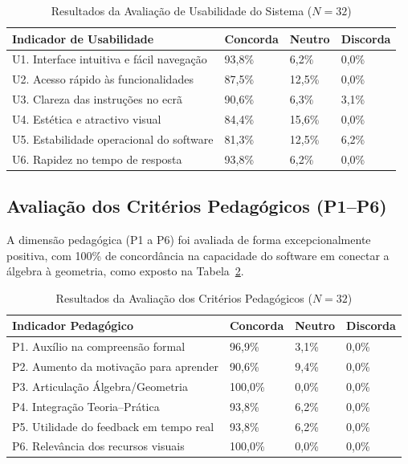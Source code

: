 \documentclass[conference]{IEEEtran}
\begin{document}
\begin{table}[htbp]
\caption{Resultados da Avaliação de Usabilidade do Sistema ($N=32$)}
\label{tab:usabilidade}
\centering
\footnotesize
\begin{tabular}{|p{3.6cm}|p{0.85cm}|p{0.75cm}|p{0.85cm}|}
\hline
\textbf{Indicador de Usabilidade} & \textbf{Concorda} & \textbf{Neutro} & \textbf{Discorda} \\
\hline
U1. Interface intuitiva e fácil navegação & 93,8\% & 6,2\% & 0,0\% \\
\hline
U2. Acesso rápido às funcionalidades & 87,5\% & 12,5\% & 0,0\% \\
\hline
U3. Clareza das instruções no ecrã & 90,6\% & 6,3\% & 3,1\% \\
\hline
U4. Estética e atractivo visual & 84,4\% & 15,6\% & 0,0\% \\
\hline
U5. Estabilidade operacional do software & 81,3\% & 12,5\% & 6,2\% \\
\hline
U6. Rapidez no tempo de resposta & 93,8\% & 6,2\% & 0,0\% \\
\hline
\end{tabular}
\end{table}

\subsection{Avaliação dos Critérios Pedagógicos (P1--P6)}

A dimensão pedagógica (P1 a P6) foi avaliada de forma excepcionalmente positiva, com 100\% de concordância na capacidade do software em conectar a álgebra à geometria, como exposto na Tabela~\ref{tab:pedagogico}.

\begin{table}[htbp]
\caption{Resultados da Avaliação dos Critérios Pedagógicos ($N=32$)}
\label{tab:pedagogico}
\centering
\footnotesize
\begin{tabular}{|p{3.6cm}|p{0.85cm}|p{0.75cm}|p{0.85cm}|}
\hline
\textbf{Indicador Pedagógico} & \textbf{Concorda} & \textbf{Neutro} & \textbf{Discorda} \\
\hline
P1. Auxílio na compreensão formal & 96,9\% & 3,1\% & 0,0\% \\
\hline
P2. Aumento da motivação para aprender & 90,6\% & 9,4\% & 0,0\% \\
\hline
P3. Articulação Álgebra/Geometria & 100,0\% & 0,0\% & 0,0\% \\
\hline
P4. Integração Teoria--Prática & 93,8\% & 6,2\% & 0,0\% \\
\hline
P5. Utilidade do feedback em tempo real & 93,8\% & 6,2\% & 0,0\% \\
\hline
P6. Relevância dos recursos visuais & 100,0\% & 0,0\% & 0,0\% \\
\hline
\end{tabular}
\end{table}
\end{document}
